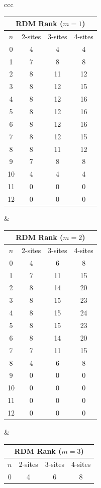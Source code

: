 \documentclass[11pt]{article}
\begin{document}
\begin{itemize}
\begin{itemize}
\begin{table}[H]
\begin{tabular}{ccc}
\begin{tabular}{|c|c|c|c|}
	\hline
	\multicolumn{4}{|c|}{\textbf{RDM Rank ($m = 1$)}} \\
	\hline
	$n$ & 2-sites & 3-sites & 4-sites \\
	\hline
	0 & 4 & 4 & 4 \\
	1 & 7 & 8 & 8 \\
	2 & 8 & 11 & 12 \\
	3 & 8 & 12 & 15 \\
	4 & 8 & 12 & 16 \\
	5 & 8 & 12 & 16 \\
	6 & 8 & 12 & 16 \\
	7 & 8 & 12 & 15 \\
	8 & 8 & 11 & 12 \\
	9 & 7 & 8 & 8 \\
	10 & 4 & 4 & 4 \\
	11 & 0 & 0 & 0 \\
	12 & 0 & 0 & 0 \\
	\hline
\end{tabular}
&
\begin{tabular}{|c|c|c|c|}
	\hline
	\multicolumn{4}{|c|}{\textbf{RDM Rank ($m = 2$)}} \\
	\hline
	$n$ & 2-sites & 3-sites & 4-sites \\
	\hline
	0 & 4 & 6 & 8 \\
	1 & 7 & 11 & 15 \\
	2 & 8 & 14 & 20 \\
	3 & 8 & 15 & 23 \\
	4 & 8 & 15 & 24 \\
	5 & 8 & 15 & 23 \\
	6 & 8 & 14 & 20 \\
	7 & 7 & 11 & 15 \\
	8 & 4 & 6 & 8 \\
	9 & 0 & 0 & 0 \\
	10 & 0 & 0 & 0 \\
	11 & 0 & 0 & 0 \\
	12 & 0 & 0 & 0 \\
	\hline
\end{tabular}
&
\begin{tabular}{|c|c|c|c|}
	\hline
	\multicolumn{4}{|c|}{\textbf{RDM Rank ($m = 3$)}} \\
	\hline
	$n$ & 2-sites & 3-sites & 4-sites \\
	\hline
	0 & 4 & 6 & 8 \\

\end{tabular}
\end{tabular}
\end{table}
\end{itemize}
\end{itemize}
\end{document}

